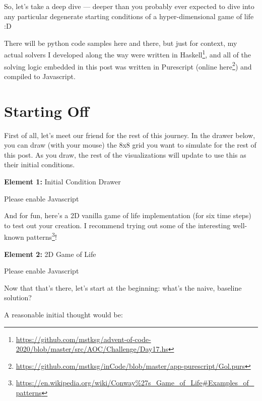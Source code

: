 \documentclass[]{article}
\renewcommand{\href}[2]{#2\footnote{\url{#1}}}
\begin{document}
So, let's take a deep dive --- deeper than you probably ever expected to dive
into any particular degenerate starting conditions of a hyper-dimensional game
of life :D

There will be python code samples here and there, but just for context, my
actual solvers I developed along the way were
\href{https://github.com/mstksg/advent-of-code-2020/blob/master/src/AOC/Challenge/Day17.hs}{written
in Haskell}, and all of the solving logic embedded in this post was written in
Purescript
(\href{https://github.com/mstksg/inCode/blob/master/app-purescript/Gol.purs}{online
here}) and compiled to Javascript.

\hypertarget{starting-off}{%
\section{Starting Off}\label{starting-off}}

First of all, let's meet our friend for the rest of this journey. In the drawer
below, you can draw (with your mouse) the 8x8 grid you want to simulate for the
rest of this post. As you draw, the rest of the visualizations will update to
use this as their initial conditions.

\leavevmode\hypertarget{golDrawer}{}%
\textbf{Element 1:} Initial Condition Drawer

\leavevmode\hypertarget{golDrawerCont}{}%
Please enable Javascript

And for fun, here's a 2D vanilla game of life implementation (for six time
steps) to test out your creation. I recommend trying out some of the
\href{https://en.wikipedia.org/wiki/Conway\%27s_Game_of_Life\#Examples_of_patterns}{interesting
well-known patterns}!

\leavevmode\hypertarget{gol2D}{}%
\textbf{Element 2:} 2D Game of Life

\leavevmode\hypertarget{gol2DCont}{}%
Please enable Javascript

Now that that's there, let's start at the beginning: what's the naive, baseline
solution?

A reasonable initial thought would be:
\end{document}
